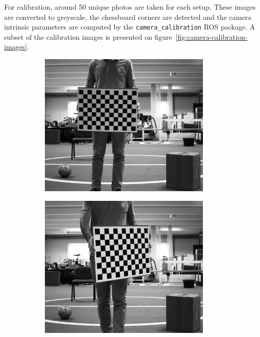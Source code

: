 For calibration, around 50 unique photos are taken for each setup. These images are converted to greyscale, the chessboard corners are detected and the camera intrinsic parameters are computed by the \texttt{camera\_calibration} ROS package. A subset of the calibration images is presented on figure~\ref{fig:camera-calibration-images}.

\begin{figure}[!ht]
	\centering
	\begin{subfigure}[c]{0.30\textwidth}
		\includegraphics[width=0.9\textwidth]{img/camera-calibration/left-0001.png}
	\end{subfigure}
	\begin{subfigure}[c]{0.30\textwidth}
		\includegraphics[width=0.9\textwidth]{img/camera-calibration/left-0005.png}

\end{subfigure}
\end{figure}
